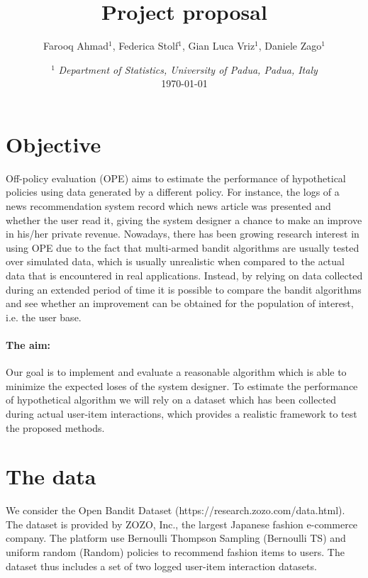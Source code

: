 \documentclass{article}
\author{Farooq Ahmad$^1$, Federica Stolf$ ^{1}$, Gian Luca Vriz$ ^{1}$, Daniele Zago$^1$}
\title{Project proposal}
\date{%
\smaller
$^1$ \textit{Department of Statistics, University of Padua, Padua, Italy}\\%
\today}
\begin{document}
\maketitle

\section{Objective}

Off-policy evaluation (OPE) aims to estimate the performance of hypothetical policies using data generated by a different policy.
For instance, the logs of a news recommendation system record which news article was presented and whether the user read it, giving the system designer a chance to make an improve in his/her private revenue.
Nowadays, there has been growing research interest in using OPE due to the fact that multi-armed bandit algorithms are usually tested over simulated data, which is usually unrealistic when compared to the actual data that is encountered in real applications.
Instead, by relying on data collected during an extended period of time it is possible to compare the bandit algorithms and see whether an improvement can be obtained for the population of interest, i.e. the user base.

\paragraph{The aim:} Our goal is to implement and evaluate a reasonable algorithm which is able to minimize the expected loses of the system designer.
To estimate the performance of hypothetical algorithm we will rely on a dataset which has been collected during actual user-item interactions, which provides a realistic framework to test the proposed methods.
\section{The data}

We consider the Open Bandit Dataset (https://research.zozo.com/data.html). The dataset is provided by ZOZO, Inc., the largest Japanese fashion e-commerce company. The platform use Bernoulli Thompson Sampling (Bernoulli TS) and uniform random (Random) policies to recommend fashion items to users. 
The dataset thus includes a set of
two logged user-item interaction datasets. 
\end{document}
